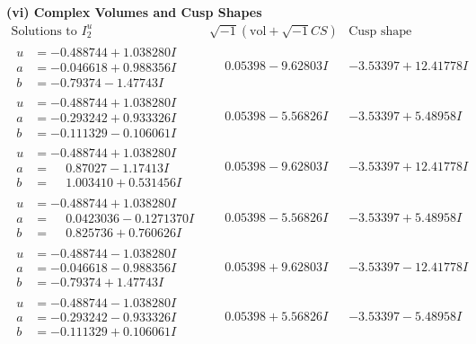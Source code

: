 \documentclass[1p]{elsarticle_modified}
\theoremstyle{definition}
\newcommand{\I}{\sqrt{-1}}
\begin{document}
\newpage\flushleft \textbf{(vi) Complex Volumes and Cusp Shapes}
$$\begin{array}{c|c|c}  
\text{Solutions to }I^u_{2}& \I (\text{vol} + \sqrt{-1}CS) & \text{Cusp shape}\\
 \hline 
\begin{aligned}
u &= -0.488744 + 1.038280 I \\
a &= -0.046618 + 0.988356 I \\
b &= -0.79374 - 1.47743 I\end{aligned}
 & \phantom{-}0.05398 - 9.62803 I & -3.53397 + 12.41778 I \\ \hline\begin{aligned}
u &= -0.488744 + 1.038280 I \\
a &= -0.293242 + 0.933326 I \\
b &= -0.111329 - 0.106061 I\end{aligned}
 & \phantom{-}0.05398 - 5.56826 I & -3.53397 + 5.48958 I \\ \hline\begin{aligned}
u &= -0.488744 + 1.038280 I \\
a &= \phantom{-}0.87027 - 1.17413 I \\
b &= \phantom{-}1.003410 + 0.531456 I\end{aligned}
 & \phantom{-}0.05398 - 9.62803 I & -3.53397 + 12.41778 I \\ \hline\begin{aligned}
u &= -0.488744 + 1.038280 I \\
a &= \phantom{-}0.0423036 - 0.1271370 I \\
b &= \phantom{-}0.825736 + 0.760626 I\end{aligned}
 & \phantom{-}0.05398 - 5.56826 I & -3.53397 + 5.48958 I \\ \hline\begin{aligned}
u &= -0.488744 - 1.038280 I \\
a &= -0.046618 - 0.988356 I \\
b &= -0.79374 + 1.47743 I\end{aligned}
 & \phantom{-}0.05398 + 9.62803 I & -3.53397 - 12.41778 I \\ \hline\begin{aligned}
u &= -0.488744 - 1.038280 I \\
a &= -0.293242 - 0.933326 I \\
b &= -0.111329 + 0.106061 I\end{aligned}
 & \phantom{-}0.05398 + 5.56826 I & -3.53397 - 5.48958 I \\ \hline\begin{aligned}

\end{aligned}
\end{array}$$
\end{document}
